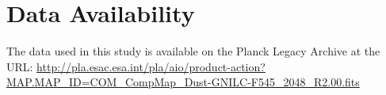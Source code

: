 \documentclass[fleqn,usenatbib]{mnras}
\begin{document}
\section*{Data Availability}

The data used in this study is available on the Planck Legacy Archive at the URL: \url{http://pla.esac.esa.int/pla/aio/product-action?MAP.MAP_ID=COM_CompMap_Dust-GNILC-F545_2048_R2.00.fits}












\bsp	%
\label{lastpage}
\end{document}

